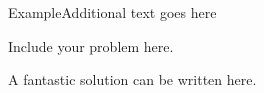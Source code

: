 \documentclass[\string~/GitHub/sthlmNordBeamerTheme/sthlmNordLightDemo.tex]{subfiles}
\begin{document}
\begin{frame}{Example}{Additional text goes here}

	\prob Include your problem here.

	\soln A fantastic solution can be written here.

\end{frame}
\end{document}
